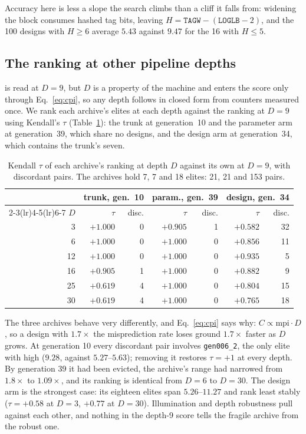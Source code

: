 \documentclass[conference]{IEEEtran}
\newcommand{\vfs}{\text{VFS}}
\newcommand{\mpki}{\text{MPKI}}
\begin{document}
Accuracy here is less a slope the search climbs than a cliff it falls from:
widening the block consumes hashed tag bits, leaving
$H=\texttt{TAGW}-(\texttt{LOGLB}-2)$, and the 100 designs with $H\ge6$ average
$5.43$ \mpki{} against $9.47$ for the 16 with $H\le5$.

\subsection{The ranking at other pipeline depths}
\label{sec:depth}

\vfs{} is read at $D=9$, but $D$ is a property of the machine and enters the
score only through Eq.~\eqref{eq:cpi}, so any depth follows in closed form from
counters measured once. We rank each archive's elites at each depth against the
ranking at $D=9$ using Kendall's $\tau$ (Table~\ref{tab:tau}): the trunk at
generation~10 and the parameter arm at generation~39, which share no designs,
and the design arm at generation~34, which contains the trunk's seven.

\begin{table}[tb]
\caption{Kendall $\tau$ of each archive's ranking at depth $D$ against its own
at $D=9$, with discordant pairs. The archives hold 7, 7 and 18 elites: 21, 21
and 153 pairs.}
\label{tab:tau}
\centering\scriptsize
\begin{tabular}{@{}rrrrrrr@{}}
\toprule
& \multicolumn{2}{c}{trunk, gen.\ 10} & \multicolumn{2}{c}{param., gen.\ 39}
& \multicolumn{2}{c}{design, gen.\ 34} \\
\cmidrule(lr){2-3}\cmidrule(lr){4-5}\cmidrule(lr){6-7}
$D$ & $\tau$ & disc. & $\tau$ & disc. & $\tau$ & disc. \\
\midrule
3  & $+1.000$ & 0 & $+0.905$ & 1 & $+0.582$ & 32 \\
6  & $+1.000$ & 0 & $+1.000$ & 0 & $+0.856$ & 11 \\
12 & $+1.000$ & 0 & $+1.000$ & 0 & $+0.935$ &  5 \\
16 & $+0.905$ & 1 & $+1.000$ & 0 & $+0.882$ &  9 \\
25 & $+0.619$ & 4 & $+1.000$ & 0 & $+0.804$ & 15 \\
30 & $+0.619$ & 4 & $+1.000$ & 0 & $+0.765$ & 18 \\
\bottomrule
\end{tabular}
\end{table}

The three archives behave very differently, and Eq.~\eqref{eq:cpi} says why:
$C\propto\text{mpi}\cdot D$, so a design with $1.7\times$ the misprediction rate
loses ground $1.7\times$ faster as $D$ grows. At generation 10 every discordant
pair involves \texttt{gen006\_2}, the only elite with high \mpki{} ($9.28$,
against $5.27$--$5.63$); removing it restores $\tau=+1$ at every depth. By
generation 39 it had been evicted, the archive's \mpki{} range had narrowed from
$1.8\times$ to $1.09\times$, and its ranking is identical from $D=6$ to $D=30$.
The design arm is the strongest case: its eighteen elites span \mpki{}
$5.26$--$11.27$ and rank least stably ($\tau=+0.58$ at $D=3$, $+0.77$ at
$D=30$). Illumination and depth robustness pull against each other, and nothing
in the depth-9 score tells the fragile archive from the robust one.
\end{document}
